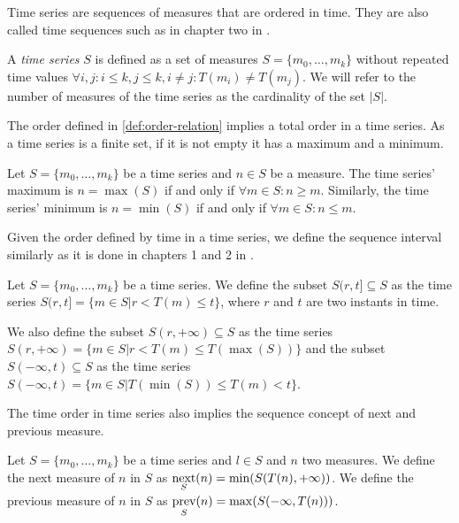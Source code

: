 Time series are sequences of measures that are ordered in time. They
are also called time sequences such as in chapter two in \cite{last}.

\begin{definition}
  A \emph{time series} $S$ is defined as a set of measures
  $S=\{m_0,\ldots,m_k\}$ without repeated time values $\forall i,j:
  i\leq k, j\leq k, i\neq j : T(m_i)\neq T(m_j)$. We will refer to the
  number of measures of the time series as the cardinality of the set
  $|S|$.
\end{definition}

The order defined in \ref{def:order-relation} implies a total order in
a time series. As a time series is a finite set, if it is not empty it
has a maximum and a minimum. 

\begin{definition}
  Let $S=\{m_0,\ldots,m_k\}$ be a time series and $n\in S$ be a
  measure. The time series' maximum is $n=\max(S)$ if and only if
  $\forall m \in S: n \geq m $.  Similarly, the time series' minimum
  is $n=\min(S)$ if and only if $\forall m \in S: n \leq m$.
\end{definition}

Given the order defined by time in a time series, we define the
sequence interval similarly as it is done in chapters 1 and 2 in \cite{last}.

\begin{definition}
  Let $S=\{m_0, \ldots, m_k\}$ be a time series. We define the subset
  $S(r,t] \subseteq S$ as the time series $S(r,t]=\{m\in S |
  r<T(m)\leq t\}$, where $r$ and $t$ are two instants in time.

  We also define the subset $S(r,+\infty)\subseteq S$ as the time
  series $S(r,+\infty) = \{m\in S | r< T(m) \leq T(\max(S))\}$ and the
  subset $S(-\infty,t)\subseteq S$ as the time series $S(-\infty,t) =
  \{m\in S | T(\min(S))\leq T(m) < t\}$.
\end{definition}

The time order in time series also implies the sequence concept of
next and previous measure.

\begin{definition}
  Let $S=\{m_0, \ldots, m_k\}$ be a time series and $l\in S$ and $n$
  two measures. We define the next measure of $n$ in $S$ as
  $\operatorname*{next}\limits_S(n) = \min(S(T(n),+\infty))$. We define the previous
  measure of $n$ in $S$ as $\operatorname*{prev}\limits_S(n) =
  \max(S(-\infty,T(n)))$.
\end{definition}




